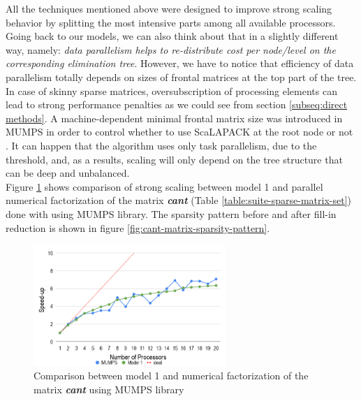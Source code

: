 All the techniques mentioned above were designed to improve strong scaling behavior by splitting the most intensive parts among all available processors. Going back to our models, we can also think about that in a slightly different way, namely: \textit{data parallelism helps to re-distribute cost per node/level on the corresponding elimination tree}. However, we have to notice that efficiency of data parallelism totally depends on sizes of frontal matrices at the top part of the tree. In case of skinny sparse matrices, oversubscription of processing elements can lead to strong performance penalties as we could see from section \ref{subseq:direct methods}. A machine-dependent minimal frontal matrix size was introduced in MUMPS in order to control whether to use ScaLAPACK at the root node or not \cite{mumps-manual}. It can happen that the algorithm uses only task parallelism, due to the threshold, and, as a results, scaling will only depend on the tree structure that can be deep and unbalanced.\\


Figure \ref{fig:model-1-vs-mumps} shows comparison of strong scaling between model 1 and parallel numerical factorization of the matrix \textit{\textbf{cant}} (Table \ref{table:suite-sparse-matrix-set}) done with using MUMPS library. The sparsity pattern before and after fill-in reduction is shown in figure \ref{fig:cant-matrix-sparsity-pattern}. 

\begin{figure}[htpb]
  \centering
  \includegraphics[width=0.65\textwidth]{figures/chapter-2/model-1-vs-mumps.png}
\caption{Comparison between model 1 and numerical factorization of the matrix \textit{\textbf{cant}} using MUMPS library}
\label{fig:model-1-vs-mumps}
\end{figure}


